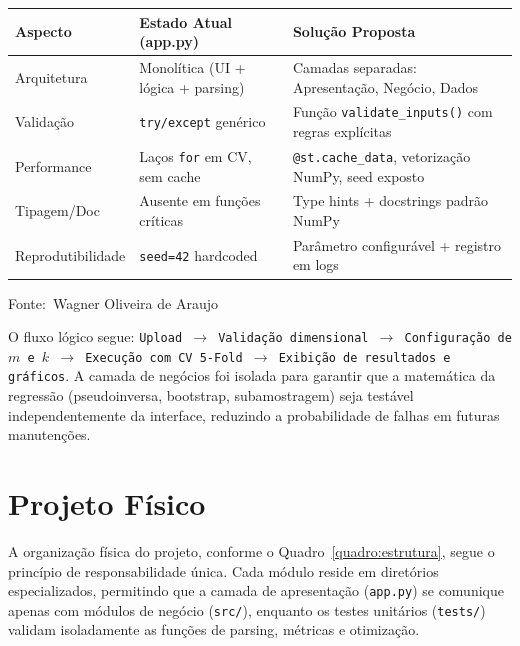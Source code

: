 \documentclass[12pt,a4paper]{article}
\newcommand{\oautor}{Wagner Oliveira de Araujo}
\begin{document}
\begin{quadro}[ht]
\centering
\small
\caption{Diagnóstico do código legado e arquitetura proposta}
\label{quadro:diagnostico}
\begin{threeparttable}
\begin{tabularx}{\textwidth}{|l|X|X|} \hline
\textbf{Aspecto} & \textbf{Estado Atual (app.py)} & \textbf{Solução Proposta} \\ \hline
Arquitetura & Monolítica (UI + lógica + parsing) & Camadas separadas: Apresentação, Negócio, Dados \\ \hline
Validação & \texttt{try/except} genérico & Função \texttt{validate\_inputs()} com regras explícitas \\ \hline
Performance & Laços \texttt{for} em CV, sem cache & \texttt{@st.cache\_data}, vetorização NumPy, seed exposto \\ \hline
Tipagem/Doc & Ausente em funções críticas & Type hints + docstrings padrão NumPy \\ \hline
Reprodutibilidade & \texttt{seed=42} hardcoded & Parâmetro configurável + registro em logs \\ \hline
\end{tabularx}
\begin{tablenotes}[flushleft]
\footnotesize
\item Fonte:~\oautor
\end{tablenotes}
\end{threeparttable}
\end{quadro}

O fluxo lógico segue: \texttt{Upload $\rightarrow$ Validação dimensional $\rightarrow$ Configuração de $m$ e $k$ $\rightarrow$ Execução com CV 5-Fold $\rightarrow$ Exibição de resultados e gráficos}. A camada de negócios foi isolada para garantir que a matemática da regressão (pseudoinversa, bootstrap, subamostragem) seja testável independentemente da interface, reduzindo a probabilidade de falhas em futuras manutenções.

\newpage
\section{Projeto Físico}

A organização física do projeto, conforme o Quadro~\ref{quadro:estrutura}, segue o princípio de responsabilidade única. Cada módulo reside em diretórios especializados, permitindo que a camada de apresentação (\texttt{app.py}) se comunique apenas com módulos de negócio (\texttt{src/}), enquanto os testes unitários (\texttt{tests/}) validam isoladamente as funções de parsing, métricas e otimização.
\end{document}
